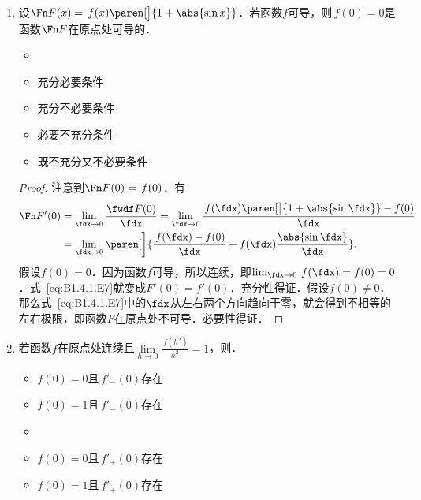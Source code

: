 \begin{enumerate}
\item 设\(\Fn F(x) = \,f(x) \paren[\big]{1+\abs{\sin x}}\)．若函数\(f\)可导，则\(\,f(0) = 0\)是函数\(\Fn F\)在原点处可导的\uline{\hfill}．
  \begin{itemize}
    \renewcommand{\labelitemi}{\faCircleThin}
    \ifshowsol
  \item[\faCircle]
    \else
  \item
    \fi
    充分必要条件
  \item 充分不必要条件
  \item 必要不充分条件
  \item 既不充分又不必要条件
  \end{itemize}

  \ifshowsol
  \begin{proof}
    注意到\(\Fn F(0) = \,f(0)\)．有
    \begin{equation}
      \begin{split}
        \Fn F'(0)
        &= \lim_{\fdx\to0} \frac{\fwdf F(0)}{\fdx}
        = \lim_{\fdx\to0} \frac{\,f(\fdx)\paren[\big]{1+\abs{\sin\fdx}} - f(0)}{\fdx} \\
        &= \lim_{\fdx\to0} \paren[\bigg]{
          \frac{\,f(\fdx) - f(0)}{\fdx}
          + f(\fdx) \frac{\abs{\sin\fdx}}{\fdx}}.
      \end{split}
      \label{eq:B1.4.1.E7}
    \end{equation}
    假设\(f(0) = 0\)．因为函数\(f\)可导，所以连续，即\(\lim_{\fdx\to0} \,f(\fdx) = f(0) = 0\)．式~\eqref{eq:B1.4.1.E7}就变成\(F'(0) = f'(0)\)．充分性得证．假设\(f(0) \ne 0\)．那么式~\eqref{eq:B1.4.1.E7}中的\(\fdx\)从左右两个方向趋向于零，就会得到不相等的左右极限，即函数\(F\)在原点处不可导．必要性得证．
  \end{proof}
  \fi

\item 若函数\(f\)在原点处连续且\(\lim\limits_{h\to0} \frac{\,f(h^2)}{h^2} = 1\)，则\uline{\hspace{8em}}．
  \begin{itemize}
    \renewcommand{\labelitemi}{\faCircleThin}
  \item \(f(0) = 0\)且\(\,f'_-(0)\)存在
  \item \(f(0) = 1\)且\(\,f'_-(0)\)存在
    \ifshowsol
  \item[\faCircle]
    \else
  \item
    \fi
    \(f(0) = 0\)且\(\,f'_+(0)\)存在
  \item \(f(0) = 1\)且\(\,f'_+(0)\)存在
  \end{itemize}


\end{enumerate}
